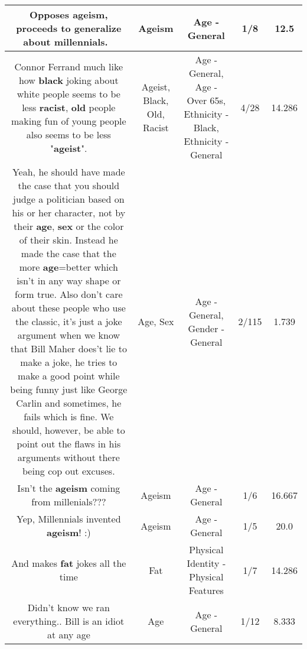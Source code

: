 \documentclass[11pt]{article}
\newlength\mylength
\begin{document}
\begin{center}
\begin{longtable}{|C{.65\mylength}|C{.30\mylength}|C{.12\mylength}|C{.12\mylength}|C{.12\mylength}|}
  \small Opposes \textbf{ageism}, proceeds to generalize about millennials. 🤔\normalsize   & Ageism & Age - General & 1/8 & 12.5 \\  \hline
  \small Connor Ferrand much like how \textbf{black} joking about white people seems to be less \textbf{racist}, \textbf{old} people making fun of young people also seems to be less "\textbf{ageist}".\normalsize   & Ageist, Black, Old, Racist & Age - General, Age - Over 65s, Ethnicity - Black, Ethnicity - General & 4/28 & 14.286 \\  \hline
  \small Yeah, he should have made the case that you should judge a politician based on his or her character, not by their \textbf{age}, \textbf{sex} or the color of their skin. Instead he made the case that the more \textbf{age}=better which isn't in any way shape or form true. Also don't care about these people who use the classic, it's just a joke argument when we know that Bill Maher does't lie to make a joke, he tries to make a good point while being funny just like George Carlin and sometimes, he fails which is fine. We should, however, be able to point out the flaws in his arguments without there being cop out excuses.\normalsize   & Age, Sex & Age - General, Gender - General & 2/115 & 1.739 \\  \hline
  \small Isn't the \textbf{ageism} coming from millenials???\normalsize   & Ageism & Age - General & 1/6 & 16.667 \\  \hline
  \small Yep, Millennials invented \textbf{ageism}!  :)\normalsize   & Ageism & Age - General & 1/5 & 20.0 \\  \hline
  \small And makes \textbf{fat} jokes all the time\normalsize   & Fat & Physical Identity - Physical Features & 1/7 & 14.286 \\  \hline
  \small Didn't know we ran everything.. Bill is an idiot at any age\normalsize   & Age & Age - General & 1/12 & 8.333 \\  \hline

\end{longtable}
\end{center}
\end{document}
